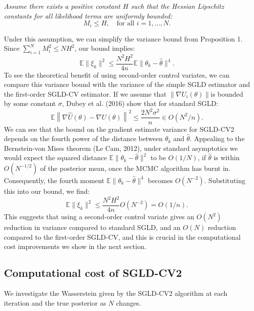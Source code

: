 \begin{assumption}
\label{ass:hess-unif} \textit{Assume there exists a positive constant $H$ such that the Hessian Lipschitz constants for all likelihood terms are uniformly bounded:}
\begin{equation}
M_i \leq H, \quad \text{for all } i = 1, \ldots, N.
\end{equation}
\end{assumption}
Under this assumption, we can simplify the variance bound from Proposition 1. Since $\sum_{i=1}^N M_i^2 \leq N H^2$, our bound implies:
\begin{equation}
\mathbb{E}\|\xi_k\|^2 \leq \frac{N^2 H^2}{4n} \mathbb{E}\|\theta_k - \hat\theta\|^4.
\end{equation}
To see the theoretical benefit of using second-order control variates, we can compare this variance bound with the variance of the simple SGLD estimator and the first-order SGLD-CV estimator. If we assume that $\|\nabla U_i(\theta)\|$is bounded by some constant $\sigma$, Dubey et al. (2016) show that for standard SGLD:
\begin{equation}
\mathbb{E}\left\|\nabla\hat{U}(\theta) - \nabla U(\theta)\right\|^2 \leq \frac{2N^2\sigma^2}{n} \in O(N^2/n).
\end{equation}
We can see that the bound on the gradient estimate variance for SGLD-CV2 depends on the fourth power of the distance between $\theta_k$ and $\hat\theta$. Appealing to the Bernstein-von Mises theorem (Le Cam, 2012), under standard asymptotics we would expect the squared distance $\mathbb{E}\|\theta_k - \hat\theta\|^2$ to be $O(1/N)$, if $\hat\theta$ is within $O(N^{-1/2})$ of the posterior mean, once the MCMC algorithm has burnt in. Consequently, the fourth moment $\mathbb{E}\|\theta_k - \hat\theta\|^4$ becomes $O(N^{-2})$. Substituting this into our bound, we find:
\begin{equation}
\mathbb{E}\|\xi_k\|^2 \leq \frac{N^2 H^2}{4n} O(N^{-2}) = O(1/n).
\end{equation}
This suggests that using a second-order control variate gives an $O(N^2)$ reduction in variance compared to standard SGLD, and an $O(N)$ reduction compared to the first-order SGLD-CV, and this is crucial in the computational cost improvements we show in
the next section.
\subsection{Computational cost of SGLD-CV2}
We investigate the Wasserstein given by the SGLD-CV2 algorithm at each iteration and the true posterior as $N$ changes.

